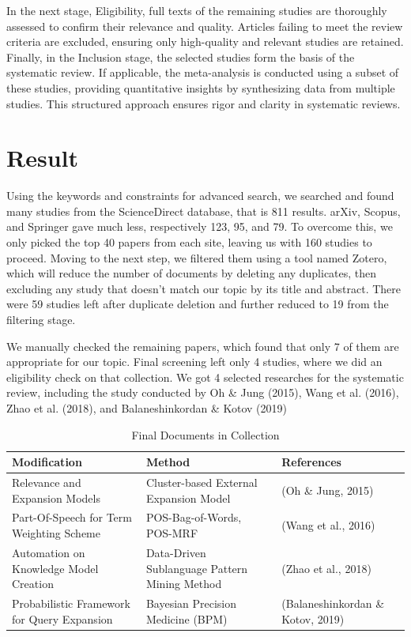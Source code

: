 \documentclass[conference]{IEEEtran}
\begin{document}
In the next stage, Eligibility, full texts of the remaining studies are thoroughly assessed to confirm their relevance and quality. Articles failing to meet the review criteria are excluded, ensuring only high-quality and relevant studies are retained. Finally, in the Inclusion stage, the selected studies form the basis of the systematic review. If applicable, the meta-analysis is conducted using a subset of these studies, providing quantitative insights by synthesizing data from multiple studies. This structured approach ensures rigor and clarity in systematic reviews.

\section{Result}

Using the keywords and constraints for advanced search, we searched and found many studies from the ScienceDirect database, that is 811 results. arXiv, Scopus, and Springer gave much less, respectively 123, 95, and 79. To overcome this, we only picked the top 40 papers from each site, leaving us with 160 studies to proceed. Moving to the next step, we filtered them using a tool named Zotero, which will reduce the number of documents by deleting any duplicates, then excluding any study that doesn't match our topic by its title and abstract. There were 59 studies left after duplicate deletion and further reduced to 19 from the filtering stage.

We manually checked the remaining papers, which found that only 7 of them are appropriate for our topic. Final screening left only 4 studies, where we did an eligibility check on that collection. We got 4 selected researches for the systematic review, including the study conducted by Oh \& Jung (2015), Wang et al. (2016), Zhao et al. (2018), and Balaneshinkordan \& Kotov (2019)

\begin{table}[htbp!]
    \centering
    \caption{Final Documents in Collection}
    \begin{tabular}{|>{\centering}m{2.5cm}|>{\centering}m{2.5cm}|>{\centering\arraybackslash}m{2.5cm}|}
        \hline
        \textbf{Modification} & \textbf{Method} & \textbf{References} \\
        \hline
        Relevance and Expansion Models & Cluster-based External Expansion Model & (Oh \& Jung, 2015) \\
        \hline
        Part-Of-Speech for Term Weighting Scheme & POS-Bag-of-Words, POS-MRF & (Wang et al., 2016) \\
        \hline
        Automation on Knowledge Model Creation & Data-Driven Sublanguage Pattern Mining Method & (Zhao et al., 2018) \\
        \hline
        Probabilistic Framework for Query Expansion & Bayesian Precision Medicine (BPM) & (Balaneshinkordan \& Kotov, 2019) \\
        \hline
    \end{tabular}
    \label{table:PRISMA-Result}
\end{table}
\end{document}
